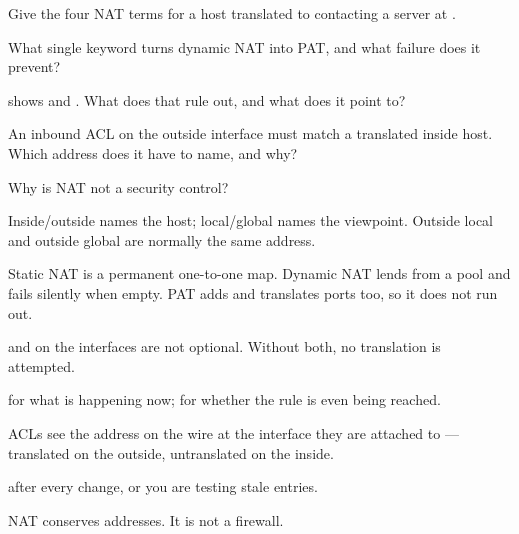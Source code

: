 \begin{checkpoint}
\begin{tightnum}
  \item Give the four NAT terms for a host  translated to
         contacting a server at .
  \item What single keyword turns dynamic NAT into PAT, and what failure does it
        prevent?
  \item {} shows  and .
        What does that rule out, and what does it point to?
  \item An inbound ACL on the outside interface must match a translated inside
        host. Which address does it have to name, and why?
  \item Why is NAT not a security control?
\end{tightnum}
\end{checkpoint}

\begin{chaptersummary}
\begin{tight}
  \item Inside/outside names the host; local/global names the viewpoint. Outside
        local and outside global are normally the same address.
  \item Static NAT is a permanent one-to-one map. Dynamic NAT lends from a pool
        and fails silently when empty. PAT adds  and translates
        ports too, so it does not run out.
  \item {} and  on the interfaces are not
        optional. Without both, no translation is attempted.
  \item {} for what is happening now;
         for whether the rule is even being reached.
  \item ACLs see the address on the wire at the interface they are attached to
        --- translated on the outside, untranslated on the inside.
  \item {} after every change, or you are testing
        stale entries.
  \item NAT conserves addresses. It is not a firewall.
\end{tight}
\end{chaptersummary}

